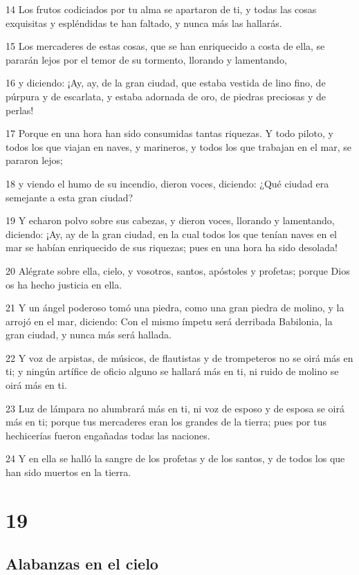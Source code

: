\par 14 Los frutos codiciados por tu alma se apartaron de ti, y todas las cosas exquisitas y espléndidas te han faltado, y nunca más las hallarás.
\par 15 Los mercaderes de estas cosas, que se han enriquecido a costa de ella, se pararán lejos por el temor de su tormento, llorando y lamentando,
\par 16 y diciendo: ¡Ay, ay, de la gran ciudad, que estaba vestida de lino fino, de púrpura y de escarlata, y estaba adornada de oro, de piedras preciosas y de perlas!
\par 17 Porque en una hora han sido consumidas tantas riquezas. Y todo piloto, y todos los que viajan en naves, y marineros, y todos los que trabajan en el mar, se pararon lejos;
\par 18 y viendo el humo de su incendio, dieron voces, diciendo: ¿Qué ciudad era semejante a esta gran ciudad?
\par 19 Y echaron polvo sobre sus cabezas, y dieron voces, llorando y lamentando, diciendo: ¡Ay, ay de la gran ciudad, en la cual todos los que tenían naves en el mar se habían enriquecido de sus riquezas; pues en una hora ha sido desolada!
\par 20 Alégrate sobre ella, cielo, y vosotros, santos, apóstoles y profetas; porque Dios os ha hecho justicia en ella.
\par 21 Y un ángel poderoso tomó una piedra, como una gran piedra de molino, y la arrojó en el mar, diciendo: Con el mismo ímpetu será derribada Babilonia, la gran ciudad, y nunca más será hallada.
\par 22 Y voz de arpistas, de músicos, de flautistas y de trompeteros no se oirá más en ti; y ningún artífice de oficio alguno se hallará más en ti, ni ruido de molino se oirá más en ti.
\par 23 Luz de lámpara no alumbrará más en ti, ni voz de esposo y de esposa se oirá más en ti; porque tus mercaderes eran los grandes de la tierra; pues por tus hechicerías fueron engañadas todas las naciones.
\par 24 Y en ella se halló la sangre de los profetas y de los santos, y de todos los que han sido muertos en la tierra.

\chapter{19}

\section*{Alabanzas en el cielo}

